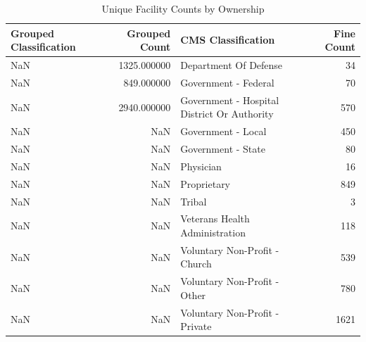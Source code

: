 \documentclass{article}
\begin{document}
\begin{table}
\caption{Unique Facility Counts by Ownership}
\label{tab:counts}
\begin{tabular}{lrlr}
\toprule
Grouped Classification & Grouped Count & CMS Classification & Fine Count \\
\midrule
NaN & 1325.000000 & Department Of Defense & 34 \\
NaN & 849.000000 & Government - Federal & 70 \\
NaN & 2940.000000 & Government - Hospital District Or Authority & 570 \\
NaN & NaN & Government - Local & 450 \\
NaN & NaN & Government - State & 80 \\
NaN & NaN & Physician & 16 \\
NaN & NaN & Proprietary & 849 \\
NaN & NaN & Tribal & 3 \\
NaN & NaN & Veterans Health Administration & 118 \\
NaN & NaN & Voluntary Non-Profit - Church & 539 \\
NaN & NaN & Voluntary Non-Profit - Other & 780 \\
NaN & NaN & Voluntary Non-Profit - Private & 1621 \\
\bottomrule
\end{tabular}
\end{table}
\end{document}
